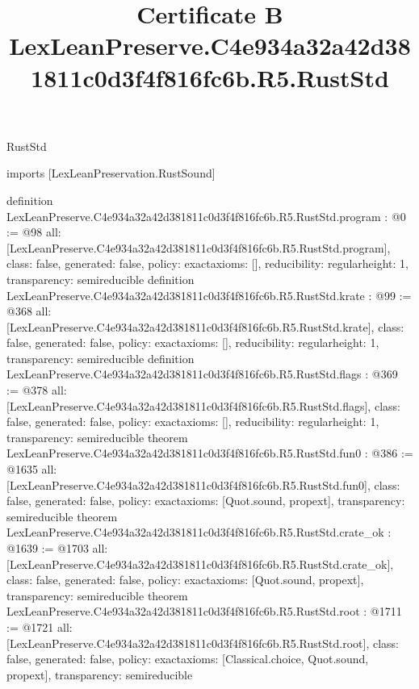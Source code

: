 \begin{lexlean}{RustStd}
\title{Certificate B LexLeanPreserve.C4e934a32a42d381811c0d3f4f816fc6b.R5.RustStd}
\begin{coremodule}
imports [LexLeanPreservation.RustSound]

definition LexLeanPreserve.C4e934a32a42d381811c0d3f4f816fc6b.R5.RustStd.program : @0 := @98 {
  all: [LexLeanPreserve.C4e934a32a42d381811c0d3f4f816fc6b.R5.RustStd.program],
  class: false,
  generated: false,
  policy: exact{axioms: []},
  reducibility: regular{height: 1},
  transparency: semireducible
}
definition LexLeanPreserve.C4e934a32a42d381811c0d3f4f816fc6b.R5.RustStd.krate : @99 := @368 {
  all: [LexLeanPreserve.C4e934a32a42d381811c0d3f4f816fc6b.R5.RustStd.krate],
  class: false,
  generated: false,
  policy: exact{axioms: []},
  reducibility: regular{height: 1},
  transparency: semireducible
}
definition LexLeanPreserve.C4e934a32a42d381811c0d3f4f816fc6b.R5.RustStd.flags : @369 := @378 {
  all: [LexLeanPreserve.C4e934a32a42d381811c0d3f4f816fc6b.R5.RustStd.flags],
  class: false,
  generated: false,
  policy: exact{axioms: []},
  reducibility: regular{height: 1},
  transparency: semireducible
}
theorem LexLeanPreserve.C4e934a32a42d381811c0d3f4f816fc6b.R5.RustStd.fun0 : @386 := @1635 {
  all: [LexLeanPreserve.C4e934a32a42d381811c0d3f4f816fc6b.R5.RustStd.fun0],
  class: false,
  generated: false,
  policy: exact{axioms: [Quot.sound, propext]},
  transparency: semireducible
}
theorem LexLeanPreserve.C4e934a32a42d381811c0d3f4f816fc6b.R5.RustStd.crate_ok : @1639 := @1703 {
  all: [LexLeanPreserve.C4e934a32a42d381811c0d3f4f816fc6b.R5.RustStd.crate_ok],
  class: false,
  generated: false,
  policy: exact{axioms: [Quot.sound, propext]},
  transparency: semireducible
}
theorem LexLeanPreserve.C4e934a32a42d381811c0d3f4f816fc6b.R5.RustStd.root : @1711 := @1721 {
  all: [LexLeanPreserve.C4e934a32a42d381811c0d3f4f816fc6b.R5.RustStd.root],
  class: false,
  generated: false,
  policy: exact{axioms: [Classical.choice, Quot.sound, propext]},
  transparency: semireducible
}


\end{coremodule}
\end{lexlean}

